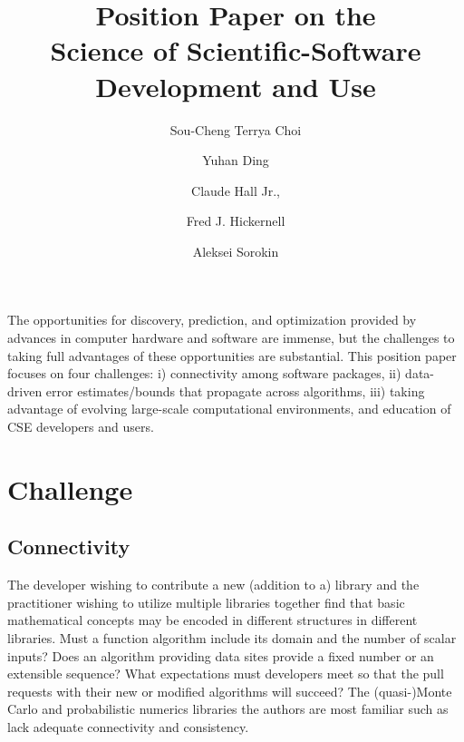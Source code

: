 \documentclass{amsart}
\begin{document}
\title{Position Paper on the \\ Science of Scientific-Software Development and Use}
\author{\vspace{-2ex}Sou-Cheng Terrya Choi}
\address[Choi, Ding, Hickernell, Sorokin]{Department of Applied Mathematics, RE 220, 10 W. 32nd St., Chicago, IL 60616}
\author{Yuhan Ding}
\author{Claude Hall Jr.,}
\address[Hall]{Birmingham Southern College, 900 Arkadelpha Rd, Birmingham, AL, 35254}
\author{Fred J. Hickernell}
\author{Aleksei Sorokin}


\maketitle

\vspace{-5ex}

The opportunities for discovery, prediction, and optimization provided by advances in computer hardware and software are immense, but the challenges to taking full advantages of these opportunities are substantial.  
This position paper focuses on four challenges: i) connectivity among software packages, ii) data-driven error estimates/bounds that propagate across algorithms, iii) taking advantage of evolving large-scale computational environments, and education of CSE developers and users.


\section{Challenge} %
\subsection{Connectivity} 
The developer wishing to contribute a new (addition to a) library and the practitioner wishing to utilize multiple libraries together find that basic mathematical concepts may be encoded in different structures in different libraries.  Must a function algorithm include its domain and the number of scalar inputs?  Does an algorithm providing data sites provide a fixed number or an extensible sequence?  What expectations must developers meet so that the pull requests with their new or modified algorithms will succeed? The (quasi-)Monte Carlo and probabilistic numerics libraries  the authors are most familiar such as \cite{QMCPy2020a,SciPyQMC,Stan,probnum} lack  adequate connectivity and consistency.
\end{document}
